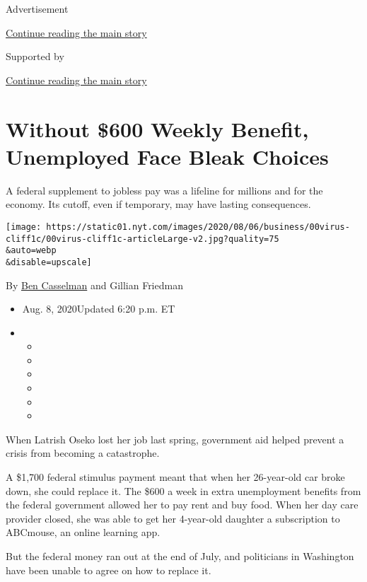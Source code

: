Advertisement

\protect\hyperlink{after-top}{Continue reading the main story}

Supported by

\protect\hyperlink{after-sponsor}{Continue reading the main story}

\hypertarget{without-600-weekly-benefit-unemployed-face-bleak-choices}{%
\section{Without \$600 Weekly Benefit, Unemployed Face Bleak
Choices}\label{without-600-weekly-benefit-unemployed-face-bleak-choices}}

A federal supplement to jobless pay was a lifeline for millions and for
the economy. Its cutoff, even if temporary, may have lasting
consequences.

\texttt{[image: https://static01.nyt.com/images/2020/08/06/business/00virus-cliff1c/00virus-cliff1c-articleLarge-v2.jpg?quality=75\\\&auto=webp\\\&disable=upscale]}

By \href{https://www.nytimes.com/by/ben-casselman}{Ben Casselman} and
Gillian Friedman

\begin{itemize}
\item
  Aug. 8, 2020Updated 6:20 p.m. ET
\item
  \begin{itemize}
  \item
  \item
  \item
  \item
  \item
  \item
  \end{itemize}
\end{itemize}

When Latrish Oseko lost her job last spring, government aid helped
prevent a crisis from becoming a catastrophe.

A \$1,700 federal stimulus payment meant that when her 26-year-old car
broke down, she could replace it. The \$600 a week in extra unemployment
benefits from the federal government allowed her to pay rent and buy
food. When her day care provider closed, she was able to get her
4-year-old daughter a subscription to ABCmouse, an online learning app.

But the federal money ran out at the end of July, and politicians in
Washington have been unable to agree on how to replace it.

